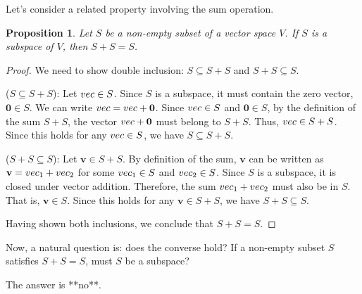 \documentclass[11pt]{article}
\newtheorem{proposition}[theorem]{Proposition}
\theoremstyle{definition}
\theoremstyle{remark}
\newcommand{\vecv}{\mathbf{v}}
\newcommand{\veczero}{\mathbf{0}}
\begin{document}
Let's consider a related property involving the sum operation.

\begin{proposition}
Let $S$ be a non-empty subset of a vector space $V$. If $S$ is a subspace of $V$, then $S+S = S$.
\end{proposition}

\begin{proof}
We need to show double inclusion: $S \subseteq S+S$ and $S+S \subseteq S$.

($S \subseteq S+S$): Let $\\vec \in S$. Since $S$ is a subspace, it must contain the zero vector, $\veczero \in S$. We can write $\\vec = \\vec + \veczero$. Since $\\vec \in S$ and $\veczero \in S$, by the definition of the sum $S+S$, the vector $\\vec + \veczero$ must belong to $S+S$. Thus, $\\vec \in S+S$. Since this holds for any $\\vec \in S$, we have $S \subseteq S+S$.

($S+S \subseteq S$): Let $\vecv \in S+S$. By definition of the sum, $\vecv$ can be written as $\vecv = \\vec_1 + \\vec_2$ for some $\\vec_1 \in S$ and $\\vec_2 \in S$. Since $S$ is a subspace, it is closed under vector addition. Therefore, the sum $\\vec_1 + \\vec_2$ must also be in $S$. That is, $\vecv \in S$. Since this holds for any $\vecv \in S+S$, we have $S+S \subseteq S$.

Having shown both inclusions, we conclude that $S+S = S$.
\end{proof}

Now, a natural question is: does the converse hold? If a non-empty subset $S$ satisfies $S+S=S$, must $S$ be a subspace?

The answer is **no**.
\end{document}
